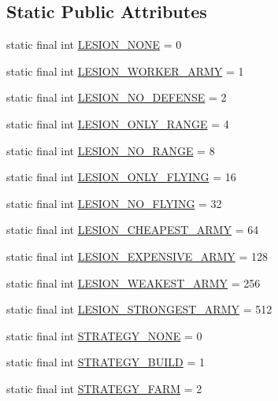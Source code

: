 \subsection*{Static Public Attributes}
\begin{DoxyCompactItemize}
\item 
static final int \hyperlink{classai_1_1general_1_1_general_a_i_ac7f5bda27c7c53dfa630ac6322c52e0c}{LESION\_\-NONE} = 0
\item 
static final int \hyperlink{classai_1_1general_1_1_general_a_i_a12fc5ff8b96447bb4d44de4a8802085a}{LESION\_\-WORKER\_\-ARMY} = 1
\item 
static final int \hyperlink{classai_1_1general_1_1_general_a_i_a4009e30711f6169f339f0693fe048138}{LESION\_\-NO\_\-DEFENSE} = 2
\item 
static final int \hyperlink{classai_1_1general_1_1_general_a_i_aa0592f035da1ad9ffee68fd94305fb09}{LESION\_\-ONLY\_\-RANGE} = 4
\item 
static final int \hyperlink{classai_1_1general_1_1_general_a_i_a1814ecad01f9ca35130005a02aa1d9b3}{LESION\_\-NO\_\-RANGE} = 8
\item 
static final int \hyperlink{classai_1_1general_1_1_general_a_i_a20fd49041df0748fcc4660d213e7251c}{LESION\_\-ONLY\_\-FLYING} = 16
\item 
static final int \hyperlink{classai_1_1general_1_1_general_a_i_a34a792c1a47cc52fd682cfd5ba3e7795}{LESION\_\-NO\_\-FLYING} = 32
\item 
static final int \hyperlink{classai_1_1general_1_1_general_a_i_a22cac1ee83cc2c16a8a80c12b1950064}{LESION\_\-CHEAPEST\_\-ARMY} = 64
\item 
static final int \hyperlink{classai_1_1general_1_1_general_a_i_a50d1efb04d889965b4d1e295bcaad805}{LESION\_\-EXPENSIVE\_\-ARMY} = 128
\item 
static final int \hyperlink{classai_1_1general_1_1_general_a_i_ae09e26fba23a2726d8dfc4b160b48bfd}{LESION\_\-WEAKEST\_\-ARMY} = 256
\item 
static final int \hyperlink{classai_1_1general_1_1_general_a_i_a29d5d7f18fa883d00fada4c526a7b659}{LESION\_\-STRONGEST\_\-ARMY} = 512
\item 
static final int \hyperlink{classai_1_1general_1_1_general_a_i_ad9254d54bbe6ccd739bf82b24fbb4c52}{STRATEGY\_\-NONE} = 0
\item 
static final int \hyperlink{classai_1_1general_1_1_general_a_i_ac8bca2198328c720d0f098f86c7f994c}{STRATEGY\_\-BUILD} = 1
\item 
static final int \hyperlink{classai_1_1general_1_1_general_a_i_a76c1b6db73db244f96e52a0ed72bb5c0}{STRATEGY\_\-FARM} = 2

\end{DoxyCompactItemize}

